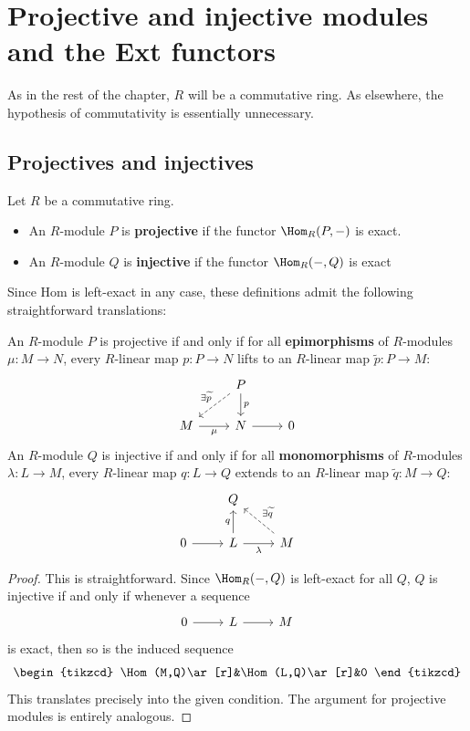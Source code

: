 \section{Projective and injective modules and the Ext functors}
As in the rest of the chapter, $R$ will be a commutative ring. As elsewhere, the hypothesis of commutativity is essentially unnecessary.
\subsection{Projectives and injectives}
\begin{definition}
Let $R$ be a commutative ring.
\begin{itemize}
\item An $R$-module $P$ is \textbf{projective} if the functor $\Hom_R(P,-)$ is exact.
\item An $R$-module $Q$ is \textbf{injective} if the functor $\Hom_R(-,Q)$ is exact
\end{itemize}
\end{definition}
Since Hom is left-exact in any case, these definitions admit the following straightforward
translations:
\begin{lemma}\label{pro inj iff}
An $R$-module $P$ is projective if and only if for all \textbf{epimorphisms} of $R$-modules $\mu:M\to N$, every $R$-linear map $p:P\to N$ lifts to an $R$-linear map $\widetilde{p}:P\to M$:
\[\begin{tikzcd}
&P\ar[ld,dashed,swap,"\exists\widetilde{p}"]\ar[d,"p"]&\\
M\ar[r,swap,"\mu"]&N\ar[r]&0
\end{tikzcd}\]
An $R$-module $Q$ is injective if and only if for all \textbf{monomorphisms} of $R$-modules $\lambda:L\to M$, every $R$-linear map $q:L\to Q$ extends to an $R$-linear map $\widetilde{q}:M\to Q$:
\[\begin{tikzcd}
&Q&\\
0\ar[r]&L\ar[u,"q"]\ar[r,swap,"\lambda"]&M\ar[lu,swap,dashed,"\exists\widetilde{q}"]
\end{tikzcd}\]
\end{lemma}
\begin{proof}
This is straightforward. Since $\Hom_R(-,Q)$ is left-exact for all $Q$, $Q$ is injective if and only if whenever a sequence
\[\begin{tikzcd}
0\ar[r]&L\ar[r]&M
\end{tikzcd}\]
is exact, then so is the induced sequence
\[\begin{tikzcd}
\Hom(M,Q)\ar[r]&\Hom(L,Q)\ar[r]&0
\end{tikzcd}\]
This translates precisely into the given condition. The argument for projective modules is entirely analogous.
\end{proof}
